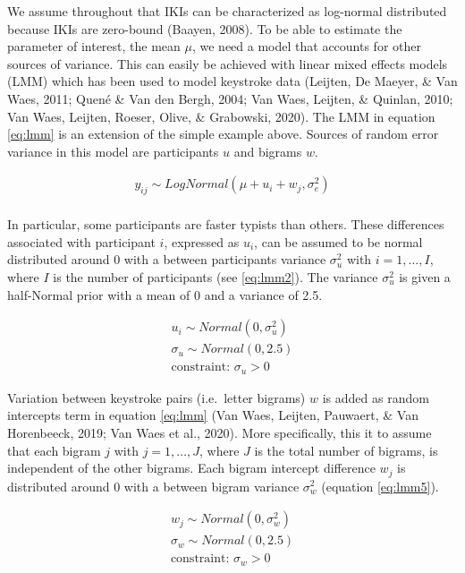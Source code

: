 \documentclass[english,man,floatsintext]{apa7}
\begin{document}
We assume throughout that IKIs can be characterized as log-normal distributed because IKIs are zero-bound (Baayen, 2008). To be able to estimate the parameter of interest, the mean \(\mu\), we need a model that accounts for other sources of variance. This can easily be achieved with linear mixed effects models (LMM) which has been used to model keystroke data (Leijten, De Maeyer, \& Van Waes, 2011; Quené \& Van den Bergh, 2004; Van Waes, Leijten, \& Quinlan, 2010; Van Waes, Leijten, Roeser, Olive, \& Grabowski, 2020). The LMM in equation \ref{eq:lmm} is an extension of the simple example above. Sources of random error variance in this model are participants \(u\) and bigrams \(w\).

\[
\tag{1}
\begin{aligned}
y_{ij} \sim LogNormal(\mu + u_i + w_j, \sigma_e^2)\\
\end{aligned}
\label{eq:lmm}
\]

In particular, some participants are faster typists than others. These differences associated with participant \(i\), expressed as \(u_i\), can be assumed to be normal distributed around 0 with a between participants variance \(\sigma_u^2\) with \(i = 1, \dots, I\), where \(I\) is the number of participants (see \ref{eq:lmm2}). The variance \(\sigma_u^2\) is given a half-Normal prior with a mean of 0 and a variance of 2.5.

\[
\tag{2}
\begin{aligned}
u_i \sim Normal(0,\sigma_u^2)\\
\sigma_u \sim Normal(0,2.5)\\
\text{constraint: } \sigma_u >0 
\end{aligned}
\label{eq:lmm2}
\]

Variation between keystroke pairs (i.e.~letter bigrams) \(w\) is added as random intercepts term in equation \ref{eq:lmm} (Van Waes, Leijten, Pauwaert, \& Van Horenbeeck, 2019; Van Waes et al., 2020). More specifically, this it to assume that each bigram \(j\) with \(j = 1, \dots, J\), where \(J\) is the total number of bigrams, is independent of the other bigrams. Each bigram intercept difference \(w_j\) is distributed around 0 with a between bigram variance \(\sigma_w^2\) (equation \ref{eq:lmm5}).

\[
\tag{3}
\begin{aligned}
w_j \sim Normal(0,\sigma_w^2)\\
\sigma_w \sim Normal(0,2.5)\\
\text{constraint: }\sigma_w >0 
\end{aligned}
\label{eq:lmm5}
\]
\end{document}
